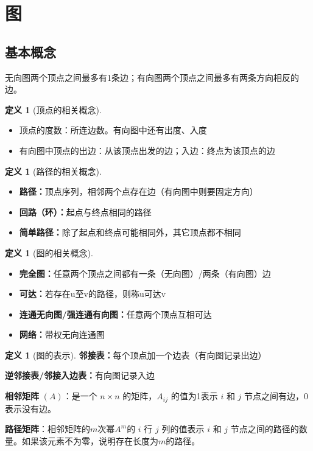 \documentclass[hyperref,a4paper,UTF8,12pt]{ctexart}
\theoremstyle{definition}
\newtheorem{definition}[theorem]{定义}
\begin{document}
\section{图}

\subsection{基本概念}
无向图两个顶点之间最多有1条边；有向图两个顶点之间最多有两条方向相反的边。
\begin{definition}[顶点的相关概念]
\ 
    \begin{itemize}
        \item 顶点的度数：所连边数。有向图中还有出度、入度
        \item 有向图中顶点的出边：从该顶点出发的边；入边：终点为该顶点的边
    \end{itemize}
\end{definition}
\begin{definition}[路径的相关概念]
\ 
    \begin{itemize}
        \item \textbf{路径：}顶点序列，相邻两个点存在边（有向图中则要固定方向）
        \item \textbf{回路（环）：}起点与终点相同的路径
        \item \textbf{简单路径：}除了起点和终点可能相同外，其它顶点都不相同
    \end{itemize}
\end{definition}
\begin{definition}[图的相关概念]
\ 
    \begin{itemize}
        \item \textbf{完全图：}任意两个顶点之间都有一条（无向图）/两条（有向图）边
        \item \textbf{可达：}若存在u至v的路径，则称u可达v
        \item \textbf{连通无向图/强连通有向图：}任意两个顶点互相可达
        \item \textbf{网络：}带权无向连通图
    \end{itemize}
\end{definition}
\begin{definition}[图的表示]
    \item \textbf{邻接表：}每个顶点加一个边表（有向图记录出边）
    \item \textbf{逆邻接表/邻接入边表：}有向图记录入边
    \item \textbf{相邻矩阵} $(A)$：是一个 $n \times n$ 的矩阵，$A_{ij}$ 的值为1表示 $i$ 和 $j$ 节点之间有边，0表示没有边。
    \item \textbf{路径矩阵}：相邻矩阵的$m$次幂$ A^m $的 $i$ 行 $j$ 列的值表示 $i$ 和 $j$ 节点之间的路径的数量。如果该元素不为零，说明存在长度为$m$的路径。
\end{definition}
\end{document}
